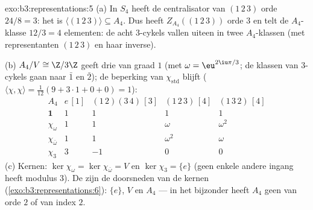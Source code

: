 \begin{solution}{exo:b3:representations:5}
(a) In $S_4$ heeft de centralisator van $(1\,2\,3)$ orde $24/8 =
3$: het is $\langle(1\,2\,3)\rangle \subseteq A_4$. Dus heeft
$Z_{A_4}((1\,2\,3))$ orde $3$ en telt de $A_4$-klasse $12/3 = 4$
elementen: de acht $3$-cykels vallen uiteen in twee
$A_4$-klassen (met representanten $(1\,2\,3)$ en haar inverse).

(b) $A_4/V \cong \Z/3\Z$ geeft drie  van graad $1$ (met
$\omega = \eu^{2\iu\pi/3}$; de klassen van $3$-cykels gaan naar
$\bar1$ en $\bar2$); de beperking van $\chi_{\mathrm{std}}$ blijft
 ($\langle\chi,\chi\rangle = \frac1{12}(9 + 3 \cdot 1 +
0 + 0) = 1$):
\[
\begin{array}{c|cccc}
A_4 & e\,[1] & (1\,2)(3\,4)\,[3] & (1\,2\,3)\,[4] &
(1\,3\,2)\,[4]\\
\hline
\mathbf 1 & 1 & 1 & 1 & 1\\
\chi_\omega & 1 & 1 & \omega & \omega^2\\
\chi_{\bar\omega} & 1 & 1 & \omega^2 & \omega\\
\chi_3 & 3 & -1 & 0 & 0
\end{array}
\]
(c) Kernen: $\ker\chi_\omega = \ker\chi_{\bar\omega} = V$ en
$\ker\chi_3 = \{e\}$ (geen enkele andere ingang heeft modulus
$3$). De  zijn de doorsneden van de kernen
(\cref{exo:b3:representations:6}): $\{e\}$, $V$ en $A_4$ --- in
het bijzonder heeft $A_4$ geen  van orde $2$ of van
index $2$.
\end{solution}

